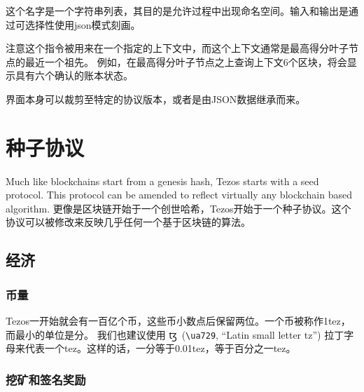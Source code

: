 \documentclass[letterpaper]{article}
\newcommand{\tz}{{\fontspec{DejaVu Sans} \small{ꜩ}}}
\begin{document}
这个名字是一个字符串列表，其目的是允许过程中出现命名空间。输入和输出是通过可选择性使用json模式刻画。

注意这个指令被用来在一个指定的上下文中，而这个上下文通常是最高得分叶子节点的最近一个祖先。
例如，在最高得分叶子节点之上查询上下文6个区块，将会显示具有六个确认的账本状态。

界面本身可以裁剪至特定的协议版本，或者是由JSON数据继承而来。

\section{种子协议}
Much like blockchains start from a genesis hash, Tezos starts with a seed
protocol. This protocol can be amended to reflect virtually any blockchain based
algorithm.
更像是区块链开始于一个创世哈希，Tezos开始于一个种子协议。这个协议可以被修改来反映几乎任何一个基于区块链的算法。

\subsection{经济}

\subsubsection{币量}
Tezos一开始就会有一百亿个币，这些币小数点后保留两位。一个币被称作1tez，而最小的单位是分。
我们也建议使用\tz~(\verb!\ua729!, ``Latin small letter tz'') 拉丁字母来代表一个tez。这样的话，一分等于0.01tez，等于百分之一tez。

\subsubsection{挖矿和签名奖励}
\end{document}
